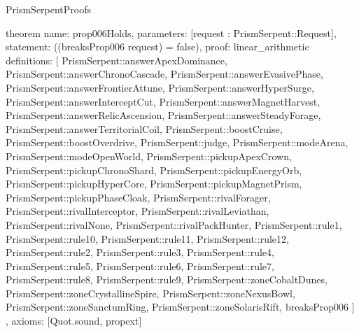 \begin{lexlean}{PrismSerpentProofs}
\begin{semanticmodule}
theorem{
  name: prop006Holds,
  parameters: [request : PrismSerpent::Request],
  statement: ((breaksProp006 request) = false),
  proof: linear_arithmetic{
    definitions: [
      PrismSerpent::answerApexDominance,
      PrismSerpent::answerChronoCascade,
      PrismSerpent::answerEvasivePhase,
      PrismSerpent::answerFrontierAttune,
      PrismSerpent::answerHyperSurge,
      PrismSerpent::answerInterceptCut,
      PrismSerpent::answerMagnetHarvest,
      PrismSerpent::answerRelicAscension,
      PrismSerpent::answerSteadyForage,
      PrismSerpent::answerTerritorialCoil,
      PrismSerpent::boostCruise,
      PrismSerpent::boostOverdrive,
      PrismSerpent::judge,
      PrismSerpent::modeArena,
      PrismSerpent::modeOpenWorld,
      PrismSerpent::pickupApexCrown,
      PrismSerpent::pickupChronoShard,
      PrismSerpent::pickupEnergyOrb,
      PrismSerpent::pickupHyperCore,
      PrismSerpent::pickupMagnetPrism,
      PrismSerpent::pickupPhaseCloak,
      PrismSerpent::rivalForager,
      PrismSerpent::rivalInterceptor,
      PrismSerpent::rivalLeviathan,
      PrismSerpent::rivalNone,
      PrismSerpent::rivalPackHunter,
      PrismSerpent::rule1,
      PrismSerpent::rule10,
      PrismSerpent::rule11,
      PrismSerpent::rule12,
      PrismSerpent::rule2,
      PrismSerpent::rule3,
      PrismSerpent::rule4,
      PrismSerpent::rule5,
      PrismSerpent::rule6,
      PrismSerpent::rule7,
      PrismSerpent::rule8,
      PrismSerpent::rule9,
      PrismSerpent::zoneCobaltDunes,
      PrismSerpent::zoneCrystallineSpire,
      PrismSerpent::zoneNexusBowl,
      PrismSerpent::zoneSanctumRing,
      PrismSerpent::zoneSolarisRift,
      breaksProp006
    ]
  },
  axioms: [Quot.sound, propext]
}
\end{semanticmodule}
\end{lexlean}
